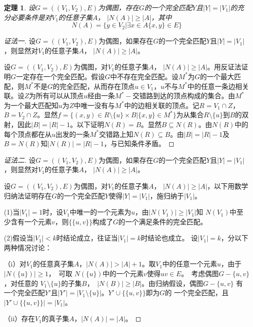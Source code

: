 \documentclass{book}[oneside]
\newtheorem{Thm}{定理}[chapter]
\begin{document}
\begin{CJK*}{UTF8}{gbsn}
    \begin{Thm}
    设$G=((V_1,V_2),E)$为偶图，存在$G$的一个完全匹配$Y$且$|Y| = |V_1|$的充分必要条件是对$V_1$的任意子集$A$， $|N(A)| \geq |A|$，其中\[N(A) = \{y\in V_2|\exists x \in A \{x,y\} \in E\}\]
  \end{Thm}
  \begin{proof}[证法一]
    设$G=((V_1,V_2),E)$为偶图，如果存在$G$的一个完全匹配$Y$且$|Y| = |V_1|$，则显然对$V_1$的任意子集$A$， $|N(A)| \geq |A|$。

        设$G=((V_1,V_2),E)$为偶图，对$V_1$的任意子集$A$， $|N(A)| \geq |A|$。用反证法证明$G$一定存在一个完全匹配。假设$G$中不存在完全匹配。设$M^*$为$G$的一个最大匹配，则$M^*$不是$G$的完全匹配，从而存在顶点$u\in V_1$，$u$不与$M^*$中的任意一条边相关联。设$Z$为所有可以从顶点$u$经由一条$M^*-$交错路到达的顶点构成的集合。由$M^*$为一个最大匹配知$u$为$Z$中唯一没有与$M^*$中的边相关联的顶点。记$R=V_1\cap Z$，$B=V_2\cap Z$。显然$f=\{(x,y)\in R\setminus \{u\}\times B | \{x,y\}\in M^*\}$为从集合$R\setminus \{u\}$到$B$的双射，因此$|B|=|R|-1$。以下证明$N(R)=B$。显然$B\subseteq N(R)$。由$N(R)$中的每个顶点都在从$u$出发的一条$M^*$交错路上知$N(R)\subseteq B$。由$|B|=|R|-1$及$B= N(R)$知$|N(R)|=|R|-1$，与已知条件矛盾。
  \end{proof}
  \begin{proof}[证法二]
设$G=((V_1,V_2),E)$为偶图，如果存在$G$的一个完全匹配$Y$且$|Y| = |V_1|$，则显然对$V_1$的任意子集$A$， $|N(A)| \geq |A|$。

设$G=((V_1,V_2),E)$为偶图，对$V_1$的任意子集$A$， $|N(A)| \geq |A|$，以下用数学归纳法证明存在$G$的一个完全匹配$Y$使得$|Y| = |V_1|$，施归纳于$|V_1|$。

(1)当$|V_1|=1$时，设$V_1$中唯一的一个元素为$u$，由$|N(V_1)| \geq |V_1|$知
$N(V_1)$中至少含有一个元素$v$，则$\{\{u,v\}\}$构成了$G$的一个满足条件的完全匹配。

(2)假设当$|V_1|<k$时结论成立，往证当$|V_1|=k$时结论也成立。
设$|V_1|=k$，分以下两种情况讨论：

（i）对$V_1$的任意真子集$A$，$|N(A)| > |A| + 1$。取$V_1$中的任意一个元素$u$，由于$|N(\{u\})| \geq 1$，　可取
$N(\{u\})$中的一个元素$v$使得$uv \in E$。　考虑偶图$G-\{u,v\}$，对任意的
$V_1\setminus \{u\}$的子集$B$，　$|N(B)| \geq |B|$。由归纳假设，偶图$G-\{u,v\}$
有一个完全匹配$Y'$且$|Y'| = |V_1\setminus \{u\}|$。$Y' \cup \{\{u,v\}\}$即为$G$的
一个完全匹配，且$|Y' \cup \{\{u,v\}\}| = |V_1|$。

（ii）存在$V_1$的真子集$A$，$|N(A)| = |A|$。


\end{proof}
\end{CJK*}
\end{document}
